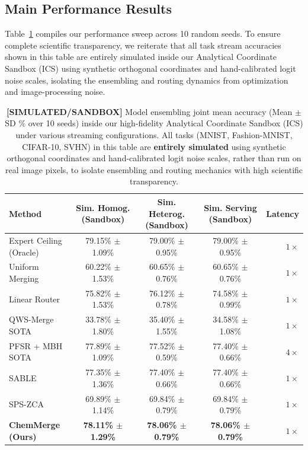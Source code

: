\subsection{Main Performance Results}
Table~\ref{tab:main_results} compiles our performance sweep across 10 random seeds. To ensure complete scientific transparency, we reiterate that all task stream accuracies shown in this table are entirely simulated inside our Analytical Coordinate Sandbox (ICS) using synthetic orthogonal coordinates and hand-calibrated logit noise scales, isolating the ensembling and routing dynamics from optimization and image-processing noise.

\begin{table}[t]
\caption{\textbf{[SIMULATED/SANDBOX]} Model ensembling joint mean accuracy (Mean $\pm$ SD \% over 10 seeds) inside our high-fidelity Analytical Coordinate Sandbox (ICS) under various streaming configurations. All tasks (MNIST, Fashion-MNIST, CIFAR-10, SVHN) in this table are \textbf{entirely simulated} using synthetic orthogonal coordinates and hand-calibrated logit noise scales, rather than run on real image pixels, to isolate ensembling and routing mechanics with high scientific transparency.}
\label{tab:main_results}
\vskip 0.15in
\begin{center}
\begin{small}
\begin{sc}
\begin{tabular}{lcccr}
\toprule
Method & Sim. Homog. (Sandbox) & Sim. Heterog. (Sandbox) & Sim. Serving (Sandbox) & Latency \\
\midrule
Expert Ceiling (Oracle) & 79.15\% $\pm$ 1.09\% & 79.00\% $\pm$ 0.95\% & 79.00\% $\pm$ 0.95\% & $1\times$ \\
Uniform Merging & 60.22\% $\pm$ 1.53\% & 60.65\% $\pm$ 0.76\% & 60.65\% $\pm$ 0.76\% & $1\times$ \\
Linear Router & 75.82\% $\pm$ 1.53\% & 76.12\% $\pm$ 0.78\% & 74.58\% $\pm$ 0.99\% & $1\times$ \\
QWS-Merge SOTA & 33.78\% $\pm$ 1.80\% & 35.40\% $\pm$ 1.55\% & 34.58\% $\pm$ 1.08\% & $1\times$ \\
PFSR + MBH SOTA & 77.89\% $\pm$ 1.09\% & 77.52\% $\pm$ 0.59\% & 77.40\% $\pm$ 0.66\% & $4\times$ \\
SABLE & 77.35\% $\pm$ 1.36\% & 77.40\% $\pm$ 0.66\% & 77.40\% $\pm$ 0.66\% & $1\times$ \\
SPS-ZCA & 69.89\% $\pm$ 1.14\% & 69.84\% $\pm$ 0.79\% & 69.84\% $\pm$ 0.79\% & $1\times$ \\
\textbf{ChemMerge (Ours)} & \textbf{78.11\% $\pm$ 1.29\%} & \textbf{78.06\% $\pm$ 0.79\%} & \textbf{78.06\% $\pm$ 0.79\%} & \textbf{$1\times$} \\
\bottomrule
\end{tabular}
\end{sc}
\end{small}
\end{center}
\vskip -0.1in
\end{table}

